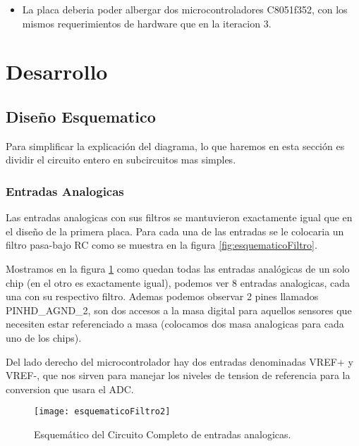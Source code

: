 \begin{itemize}
  \item La placa deberia poder albergar dos microcontroladores C8051f352, con los mismos requerimientos de hardware que en la iteracion 3.
\end{itemize}


\section{Desarrollo} %
\label{sec:desarrollo}

\subsection{Diseño Esquematico}
\label{sub: diseño_esquematico2}

Para simplificar la explicación del diagrama, lo que haremos en esta sección es dividir el circuito entero en subcircuitos mas simples.

\subsubsection{Entradas Analogicas}
\label{subsub: entradas_analogicas2}

Las entradas analogicas con sus filtros se mantuvieron exactamente igual que en el diseño de la primera placa. Para cada una de las entradas se le colocaria un filtro pasa-bajo RC como se muestra en la figura \ref{fig:esquematicoFiltro}.

Mostramos en la figura \ref{fig:esquematicoFiltro2} como quedan todas las entradas analógicas de un solo chip (en el otro es exactamente igual), podemos ver 8 entradas analogicas, cada una con su respectivo filtro. Ademas podemos observar 2 pines llamados PINHD\_AGND\_2, son dos accesos a la masa digital para aquellos sensores que necesiten estar referenciado a masa (colocamos dos masa analogicas para cada uno de los chips).

Del lado derecho del microcontrolador hay dos entradas denominadas VREF+ y VREF-, que nos sirven para manejar los niveles de tension de referencia para la conversion que usara el ADC.

\begin{figure}[H]
\centering
  \texttt{[image: esquematicoFiltro2]}
  \caption{Esquemático del Circuito Completo de entradas analogicas.}\label{fig:esquematicoFiltro2}
\end{figure}

